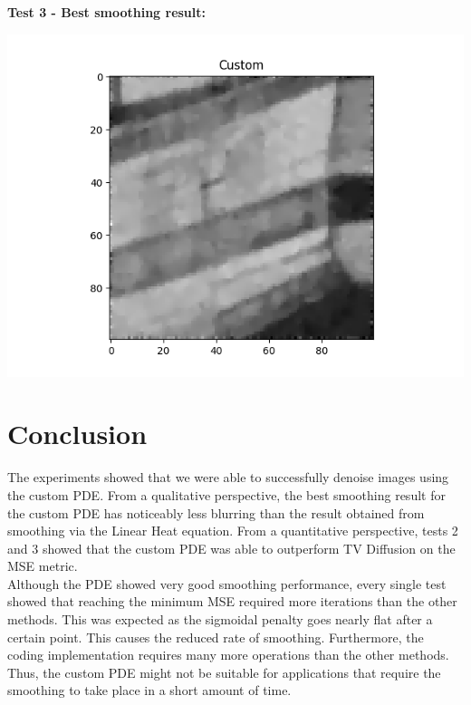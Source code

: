 \documentclass{article}
\begin{document}
  \vspace{12 pt}
  \noindent \textbf{Test 3 - Best smoothing result:}
  \begin{center}
    \includegraphics[width=\textwidth]{../generated_images/Custom_test3.png}
  \end{center}


  \newpage
  \section{Conclusion}

  \noindent
  The experiments showed that we were able to successfully
  denoise images using the custom PDE. From a qualitative
  perspective, the best smoothing result for the custom PDE
  has noticeably less blurring than the result obtained from smoothing via
  the Linear Heat equation. From a quantitative perspective, tests 2 and 3
  showed that the custom PDE was able to outperform TV Diffusion on
  the MSE metric.\\

  \noindent
  Although the PDE showed very good smoothing performance, every single
  test showed that reaching the minimum MSE required
  more iterations than the other methods. This was expected as
  the sigmoidal penalty goes nearly flat after a certain point. This
  causes the reduced rate of smoothing. Furthermore, the coding
  implementation requires many more operations than the other methods.
  Thus, the custom PDE might not be suitable for applications that require 
  the smoothing to take place in a short amount of time.\\
\end{document}
